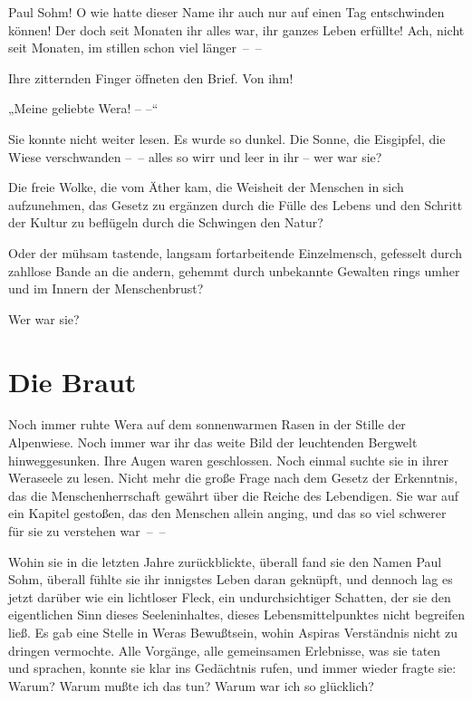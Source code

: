 Paul Sohm! O wie hatte dieser Name ihr auch nur auf einen Tag
entschwinden können! Der doch seit Monaten ihr alles war, ihr
ganzes Leben erfüllte! Ach, nicht seit Monaten, im stillen schon
viel länger~–~–

Ihre zitternden Finger öffneten den Brief. Von ihm!

„Meine geliebte Wera! – –“

Sie konnte nicht weiter lesen. Es wurde so dunkel. Die Sonne, die
Eisgipfel, die Wiese verschwanden –~– alles so wirr und leer in ihr
– wer war sie?

Die freie Wolke, die vom Äther kam, die Weisheit der Menschen in
sich aufzunehmen, das Gesetz zu ergänzen durch die Fülle des Lebens
und den Schritt der Kultur zu beflügeln durch die Schwingen den
Natur?

Oder der mühsam tastende, langsam fortarbeitende Einzelmensch,
gefesselt durch zahllose Bande an die andern, gehemmt durch
unbekannte Gewalten rings umher und im Innern der Menschenbrust?

Wer war sie?

\section{Die Braut}

Noch immer ruhte Wera auf dem sonnenwarmen Rasen in der Stille der
Alpenwiese. Noch immer war ihr das weite Bild der leuchtenden
Bergwelt hinweggesunken. Ihre Augen waren geschlossen. Noch einmal
suchte sie in ihrer Weraseele zu lesen. Nicht mehr die große Frage
nach dem Gesetz der Erkenntnis, das die Menschenherrschaft gewährt
über die Reiche des Lebendigen. Sie war auf ein Kapitel gestoßen,
das den Menschen allein anging, und das so viel schwerer für sie zu
verstehen war~–~–

Wohin sie in die letzten Jahre zurückblickte, überall fand sie den
Namen Paul Sohm, überall fühlte sie ihr innigstes Leben daran
geknüpft, und dennoch lag es jetzt darüber wie ein lichtloser
Fleck, ein undurchsichtiger Schatten, der sie den eigentlichen Sinn
dieses Seeleninhaltes, dieses Lebensmittelpunktes nicht begreifen
ließ. Es gab eine Stelle in Weras Bewußtsein, wohin Aspiras
Verständnis nicht zu dringen vermochte. Alle Vorgänge, alle
gemeinsamen Erlebnisse, was sie taten und sprachen, konnte sie klar
ins Gedächtnis rufen, und immer wieder fragte sie: Warum? Warum
mußte ich das tun? Warum war ich so glücklich?

